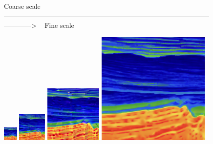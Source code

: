 \documentclass[
]{article}
\begin{document}
\begin{figure}

\begin{minipage}{\linewidth}

\end{minipage}%
\newline
\begin{minipage}{\linewidth}

\end{minipage}%
\newline
\begin{minipage}{\linewidth}

Coarse scale ~
------------------------------------------------------------------------------------------------------\textgreater{}
~ Fine scale

\end{minipage}%
\newline
\begin{minipage}{\linewidth}

\end{minipage}%
\newline
\begin{minipage}{\linewidth}

\end{minipage}%
\newline
\begin{minipage}{\linewidth}

\includegraphics[width=0.0625\textwidth,height=\textheight]{./figs/j3_.png}
\includegraphics[width=0.125\textwidth,height=\textheight]{./figs/j2_.png}
\includegraphics[width=0.25\textwidth,height=\textheight]{./figs/j1_.png}
\includegraphics[width=0.5\textwidth,height=\textheight]{./figs/WSGM_m1.png}


\end{minipage}
\end{figure}
\end{document}
